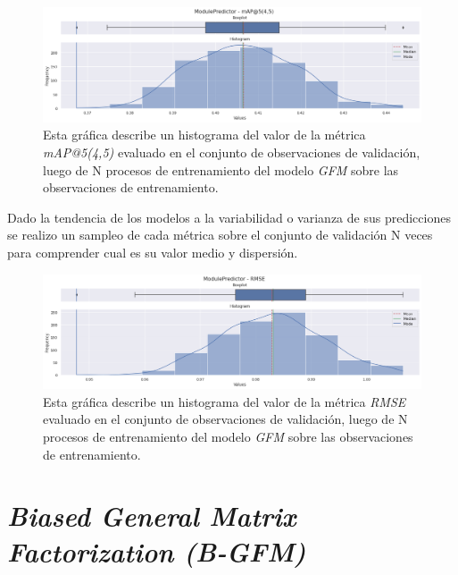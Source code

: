 \documentclass[11pt,a4paper,twoside]{thesis}
\begin{document}
\clearpage

\begin{figure}[h!]
	\centering
	\includegraphics[width=15cm]{./images/metrics-GFM-mapk.png}
	\caption{Esta gráfica describe un histograma del valor de la métrica \textit{mAP@5(4,5)} evaluado en el conjunto de observaciones de validación, luego de N procesos de entrenamiento del modelo \textit{GFM} sobre las observaciones de entrenamiento.}
\end{figure}

Dado la tendencia de los modelos a la variabilidad o varianza de sus predicciones se realizo un sampleo de cada métrica sobre el conjunto de validación N veces para comprender cual es su valor medio y dispersión.

\begin{figure}[h!]
	\centering
	\includegraphics[width=15cm]{./images/metrics-GFM-RMSE.png}
	\caption{Esta gráfica describe un histograma del valor de la métrica \textit{RMSE} evaluado en el conjunto de observaciones de validación, luego de N procesos de entrenamiento del modelo \textit{GFM} sobre las observaciones de entrenamiento.}
\end{figure}



\clearpage
\section{\textit{Biased General Matrix Factorization (B-GFM)}}
\end{document}
